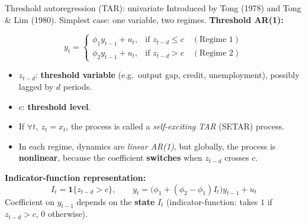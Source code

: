 \documentclass{beamer}
\begin{document}
\begin{frame}{Threshold autoregression (TAR): univariate}
\small
Introduced by Tong (1978) and Tong \& Lim (1980).
Simplest case: one variable, two regimes. \textbf{Threshold AR(1):}

\[
y_t =
\begin{cases}
\phi_1 y_{t-1} + u_t, & \text{if } z_{t-d} \le c \quad (\text{Regime 1}) \\
\phi_2 y_{t-1} + u_t, & \text{if } z_{t-d} > c \quad (\text{Regime 2})
\end{cases}
\]

\begin{itemize}
  \item $z_{t-d}$: \textbf{threshold variable} (e.g.\ output gap, credit, unemployment),
        possibly lagged by $d$ periods.
  \item $c$: \textbf{threshold level}.
  \item If $\forall t,\ z_t = x_t$, the process is called a \emph{self-exciting TAR} (SETAR) process.
\end{itemize}

\begin{itemize}
  \item In each regime, dynamics are \emph{linear AR(1)}, but globally, the process is \textbf{nonlinear}, because the coefficient\textbf{ switches} when $z_{t-d}$ crosses $c$.
\end{itemize}

\textbf{Indicator-function representation:}
\[
I_t = \mathbf{1}\{z_{t-d} > c\}, \qquad
y_t = \big(\phi_1 + (\phi_2 - \phi_1) I_t \big) y_{t-1} + u_t
\]
Coefficient on $y_{t-1}$ depends on the \textbf{state} $I_t$ (indicator-function: takes $1$ if $z_{t-d} > c$, $0$ otherwise).

\end{frame}
\end{document}
